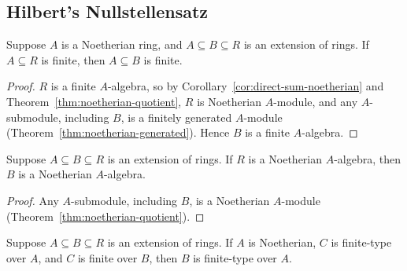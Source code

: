 \subsection*{Hilbert's Nullstellensatz}

\begin{proposition}\label{prop:noetherian-finite}
    Suppose \(A\) is a Noetherian ring,
    and \(A \subseteq B \subseteq R\) is an extension of rings.
    If \(A \subseteq R\) is finite, then \(A \subseteq B\) is finite.
\end{proposition}
\begin{proof}
    \(R\) is a finite \(A\)-algebra,
    so by Corollary~\ref{cor:direct-sum-noetherian} and Theorem~\ref{thm:noetherian-quotient},
    \(R\) is Noetherian \(A\)-module,
    and any \(A\)-submodule, including \(B\), is a finitely generated \(A\)-module
    (Theorem~\ref{thm:noetherian-generated}).
    Hence \(B\) is a finite \(A\)-algebra.
\end{proof}
\begin{proposition}
    Suppose \(A \subseteq B \subseteq R\) is an extension of rings.
    If \(R\) is a Noetherian \(A\)-algebra, then \(B\) is a Noetherian \(A\)-algebra.
\end{proposition}
\begin{proof}
    Any \(A\)-submodule, including \(B\), is a Noetherian \(A\)-module (Theorem~\ref{thm:noetherian-quotient}).
\end{proof}
\begin{theorem}\label{thm:noetherian-finite-type}
    Suppose \(A \subseteq B \subseteq R\) is an extension of rings.
    If \(A\) is Noetherian, \(C\) is finite-type over \(A\),
    and \(C\) is finite over \(B\),
    then \(B\) is finite-type over \(A\).
\end{theorem}

